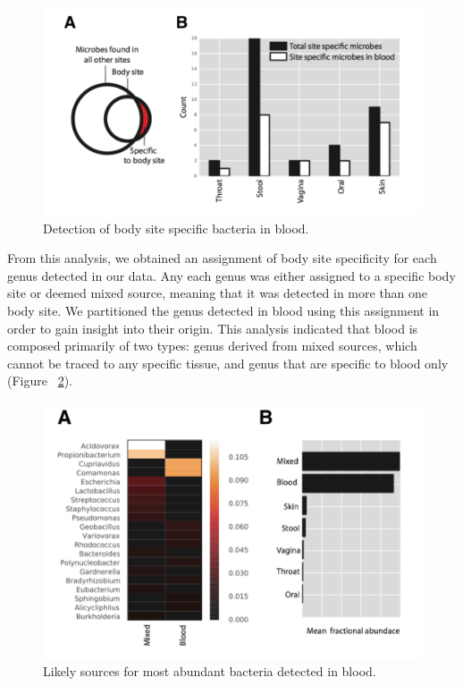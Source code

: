 \begin{figure}
\center\includegraphics[width=150mm,scale=0.5]{Figures/Fig13}
\caption{Detection of body site specific bacteria in blood.}
\label{fig:Fig13}
\end{figure}

From this analysis, we obtained an assignment of body site specificity for each genus detected in our data. Any each genus was either assigned to a specific body site or deemed mixed source, meaning that it was detected in more than one body site. We partitioned the genus detected in blood using this assignment in order to gain insight into their origin. This analysis indicated that blood is composed primarily of two types: genus derived from mixed sources, which cannot be traced to any specific tissue, and genus that are specific to blood only (Figure ~\ref{fig:Fig14}).

\begin{figure}
\center\includegraphics[width=120mm,scale=0.5]{Figures/Fig14}
\caption{Likely sources for most abundant bacteria detected in blood.}
\label{fig:Fig14}
\end{figure}

